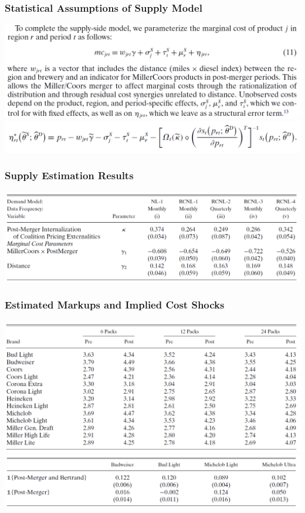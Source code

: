 \documentclass{beamer}
\begin{document}
\begin{frame}\frametitle{Statistical Assumptions of Supply Model}
    \centering
    \includegraphics[width=0.95\linewidth]{eq_11} \\
    \vspace{4ex}
    \includegraphics[width=\linewidth]{eq_12}
\end{frame}

\begin{frame}\frametitle{Supply Estimation Results}
    \centering
    \includegraphics[width=0.95\linewidth]{table_6}
\end{frame}

\begin{frame}\frametitle{Estimated Markups and Implied Cost Shocks}
    \centering
    \includegraphics[width=0.95\linewidth]{table_7} \\
    \vspace{2ex}
    \includegraphics[width=0.95\linewidth]{table_8}
\end{frame}
\end{document}
